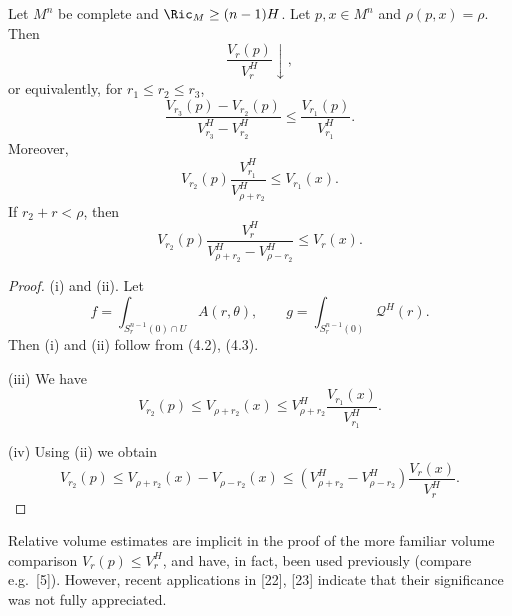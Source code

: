 \begin{proposition}
\label{prop:relative-volume-estimates}

Let $M^n$ be complete and $\Ric_M\geq (n-1)H$. Let $p,x\in M^n$ and
$\rho(p,x)=\rho$. Then
\begin{equation}
\tag{i}
\frac{V_r(p)}{V_r^H}\downarrow,
\end{equation}
or equivalently, for $r_1 \le r_2 \le r_3$,
\begin{equation}
\tag{ii}
\frac{V_{r_3}(p)-V_{r_2}(p)}{V_{r_3}^H-V_{r_2}^H}\le \frac{V_{r_1}(p)}{V_{r_1}^H}.
\end{equation}
Moreover,
\begin{equation}
\tag{iii}
V_{r_2}(p)\frac{V_{r_1}^H}{V_{\rho+r_2}^H}\le V_{r_1}(x).
\end{equation}
If $r_2+r<\rho$, then
\begin{equation}
\tag{iv}
V_{r_2}(p)\frac{V_r^H}{V_{\rho+r_2}^H-V_{\rho-r_2}^H}\le V_r(x).
\end{equation}
\end{proposition}

\begin{proof}
(i) and (ii). Let
\begin{equation}
\tag{4.10}
f=\int_{S_r^{n-1}(0)\cap U}A(r,\theta), \qquad g=\int_{S_r^{n-1}(0)}\mathcal{Q}^H(r).
\end{equation}
Then (i) and (ii) follow from (4.2), (4.3).

(iii) We have
\begin{equation}
\tag{4.11}
V_{r_2}(p)\le V_{\rho+r_2}(x)\le V_{\rho+r_2}^H\frac{V_{r_1}(x)}{V_{r_1}^H}.
\end{equation}

(iv) Using (ii) we obtain
\begin{equation}
\tag{4.12}
V_{r_2}(p)\le V_{\rho+r_2}(x)-V_{\rho-r_2}(x)\le \left(V_{\rho+r_2}^H-V_{\rho-r_2}^H\right)\frac{V_r(x)}{V_r^H}.
\end{equation}
\end{proof}

Relative volume estimates are implicit in the proof of the more familiar volume
comparison $V_r(p)\le V_r^H$, and have, in fact, been used previously (compare
e.g.\ [5]). However, recent applications in [22], [23] indicate that their
significance was not fully appreciated.

